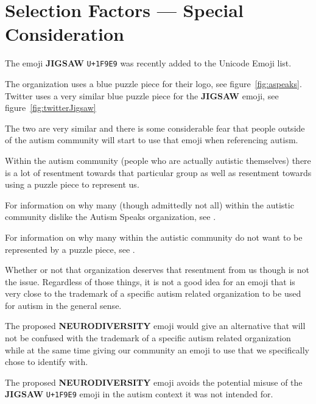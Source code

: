 \section{Selection Factors --- Special Consideration}

The emoji \textbf{JIGSAW} \texttt{U+1F9E9} was recently added to the Unicode Emoji list.

The organization  uses a blue puzzle
piece for their logo, see figure~\ref{fig:aspeaks}. Twitter uses a very similar blue
puzzle piece for the \textbf{JIGSAW} emoji, see figure~\ref{fig:twitterJigsaw}

The two are very similar and there is some considerable fear that people outside of the
autism community will start to use that emoji when referencing autism.

Within the autism community (people who are actually autistic themselves) there is a lot of
resentment towards that particular group as well as resentment towards using a puzzle piece
to represent us.

For information on why many (though admittedly not all) within the autistic community dislike
the Autism Speaks organization, see
.

For information on why many within the autistic community do not want to be represented by a
puzzle piece, see
.

Whether or not that organization deserves that resentment from us though is not the issue.
Regardless of those things, it is not a good idea for an emoji that is very close to the
trademark of a specific autism related organization to be used for autism in the general
sense.

The proposed \textbf{NEURODIVERSITY} emoji would give an alternative that will not be confused
with the trademark of a specific autism related organization while at the same time giving our
community an emoji to use that we specifically chose to identify with.

The proposed \textbf{NEURODIVERSITY} emoji avoids the potential misuse of the \textbf{JIGSAW} \texttt{U+1F9E9}
emoji in the autism context it was not intended for.

